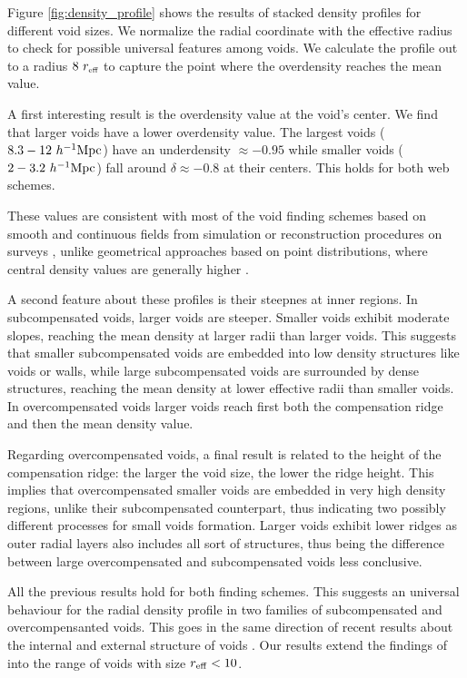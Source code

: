 \documentclass[a4,useAMS,usenatbib,usegraphicx]{mn2e}
\newcommand{\hMpc}{{\ifmmode{h^{-1}{\rm Mpc}}\else{$h^{-1}$Mpc}\fi}}
\newcommand{\reff}{{\ifmmode{r_{\mbox{\tiny eff}}}\else{$r_{\mbox{\tiny eff}}$}\fi}}
\begin{document}
Figure \ref{fig:density_profile} shows the results of stacked density
profiles for different void sizes.  
We normalize the radial coordinate with the effective radius to check
for possible universal features among voids. 
We calculate the profile out to a radius $8\ \reff$  to capture the
point where the overdensity reaches the mean value.


A first interesting result is the overdensity value at the void's
center.
We find that larger voids have a lower overdensity value.
The largest voids ($8.3-12\ \hMpc$) have an underdensity
$\approx-0.95$ while smaller voids  ($2-3.2\ \hMpc$) fall around $\delta\approx 
-0.8$ at their centers.
This holds for both web schemes. 

These values are consistent with most of the void finding schemes
based on smooth and continuous fields from simulation or
reconstruction procedures on surveys \citep{Plionis02, Colberg05,
  Shandarin06,  Platen07, Neyrinck08, MunozCuartas11, Neyrinck13,
  Ricciardelli2013}, unlike geometrical approaches based on point
distributions, where central density values are generally higher
\citep{Colberg08}. 


A second feature about these profiles is their steepnes at inner
regions.  
In subcompensated voids, larger voids are steeper.
Smaller voids exhibit moderate slopes, reaching the mean density at
larger radii than larger voids.
This suggests that smaller subcompensated voids are embedded into low
density structures like voids or walls, while large subcompensated
voids are surrounded  by dense structures, reaching the mean density
at lower effective radii than smaller voids.
In overcompensated voids larger voids reach first  both the
compensation ridge and then the mean density value.  


Regarding overcompensated voids, a final result is related to the height 
of the compensation ridge: the larger the void size, the lower the ridge
height. This implies that overcompensated smaller voids are embedded in 
very high density regions, unlike their subcompensated counterpart, thus 
indicating two possibly different processes for small voids formation. 
Larger voids exhibit lower ridges as outer radial layers also includes all
sort of structures, thus being the difference between large overcompensated
and subcompensated voids less conclusive.

All the previous results hold for both finding schemes.
This suggests an universal behaviour for the radial density profile in
two families of subcompensated and overcompensanted voids. 
This goes in the same direction of recent results about the internal
\citep{Colberg05,  Ricciardelli2013} and external structure of voids
\citep{Lavaux12, Hamaus14}. 
Our results extend the findings of \cite{Hamaus14} into the range of
voids with size $r_{\rm eff}<10$\hMpc. 
\end{document}
